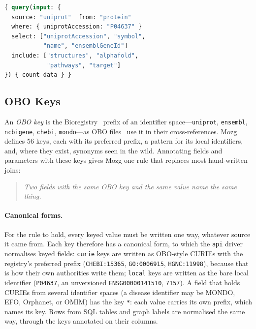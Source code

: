\documentclass[sigconf,nonacm]{acmart}
\begin{document}
\begin{lstlisting}[language=GraphQL,caption={One protein, its structures, predicted model, pathways and drug-target record: five databases, one query.},label={lst:uniprot}]
{ query(input: {
  source: "uniprot"  from: "protein"
  where: { uniprotAccession: "P04637" }
  select: ["uniprotAccession", "symbol",
           "name", "ensemblGeneId"]
  include: ["structures", "alphafold",
            "pathways", "target"]
}) { count data } }
\end{lstlisting}

\subsection{OBO Keys}
\label{sec:obo}

An \emph{OBO key} is the Bioregistry~\cite{bioregistry} prefix of an
identifier space---\texttt{uniprot}, \texttt{ensembl},
\texttt{ncbigene}, \texttt{chebi}, \texttt{mondo}---as OBO
files~\cite{obofoundry} use it in their cross-references.  Mozg defines
56 keys, each with its preferred prefix, a pattern for its local
identifiers, and, where they exist, synonyms seen in the wild.
Annotating fields and parameters with these keys gives Mozg one rule
that replaces most hand-written joins:
\begin{quote}
  \emph{Two fields with the same OBO key and the same value name the
  same thing.}
\end{quote}

\paragraph{Canonical forms.}
For the rule to hold, every keyed value must be written one way,
whatever source it came from.  Each key therefore has a canonical form,
to which the \texttt{api} driver normalises keyed fields:
\texttt{curie} keys are written as OBO-style CURIEs with the registry's
preferred prefix (\texttt{CHEBI:15365}, \texttt{GO:0006915},
\texttt{HGNC:11998}), because that is how their own authorities write
them; \texttt{local} keys are written as the bare local identifier
(\texttt{P04637}, an unversioned \texttt{ENSG00000141510},
\texttt{7157}).  A field that holds CURIEs from several identifier
spaces (a disease identifier may be MONDO, EFO, Orphanet, or OMIM) has
the key \texttt{*}: each value carries its own prefix, which names its
key.  Rows from SQL tables and graph labels are normalised the same
way, through the keys annotated on their columns.
\end{document}
